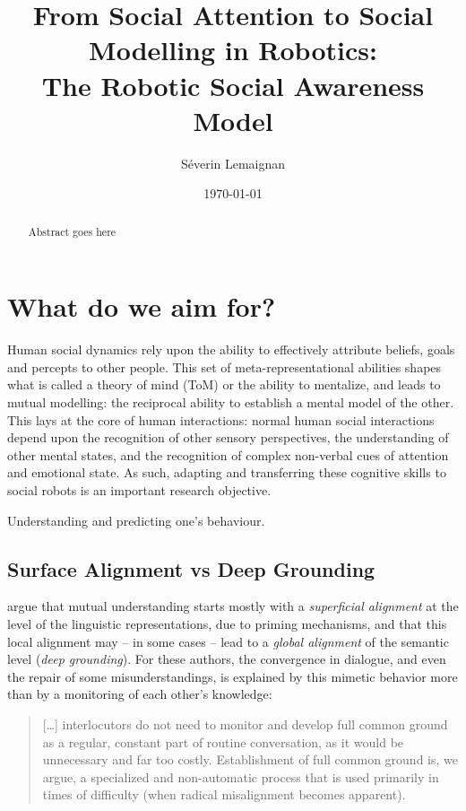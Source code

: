 \documentclass[a4paper]{article}
\title{From Social Attention to Social Modelling in Robotics:\\ The Robotic Social Awareness Model}
\author{Séverin Lemaignan}
\date{\today}
\begin{document}
\maketitle

\begin{abstract}
Abstract goes here
\end{abstract}

\section{What do we aim for?}

Human social dynamics rely upon the ability to effectively attribute beliefs,
goals and percepts to other people. This set of meta-representational abilities
shapes what is called a theory of mind (ToM) or the ability to mentalize, and
leads to mutual modelling: the reciprocal ability to establish a mental model of
the other. This lays at the core of human interactions: normal human social
interactions depend upon the recognition of other sensory perspectives, the
understanding of other mental states, and the recognition of complex non-verbal
cues of attention and emotional state. As such, adapting and transferring these
cognitive skills to social robots is an important research objective.


Understanding and predicting one's behaviour.


\subsection{Surface Alignment vs Deep Grounding}

\citet{pickering2006alignment} argue that mutual understanding
starts mostly with a \emph{superficial alignment} at the level of the linguistic
representations, due to priming mechanisms, and that this local alignment may --
in some cases -- lead to a \emph{global alignment} of the semantic level
(\emph{deep grounding}).  For these authors, the convergence in dialogue, and
even the repair of some misunderstandings, is explained by this mimetic behavior
more than by a monitoring of each other's knowledge:

\begin{quote}
[\ldots] interlocutors do
not need to monitor and develop full common ground as a regular, constant
part of routine conversation, as it would be unnecessary and far too costly.
Establishment of full common ground is, we argue, a specialized and
non-automatic process that is used primarily in times of difficulty (when
radical misalignment becomes apparent).~\citep[p.179]{pickering2006alignment}
\end{quote}
\end{document}
